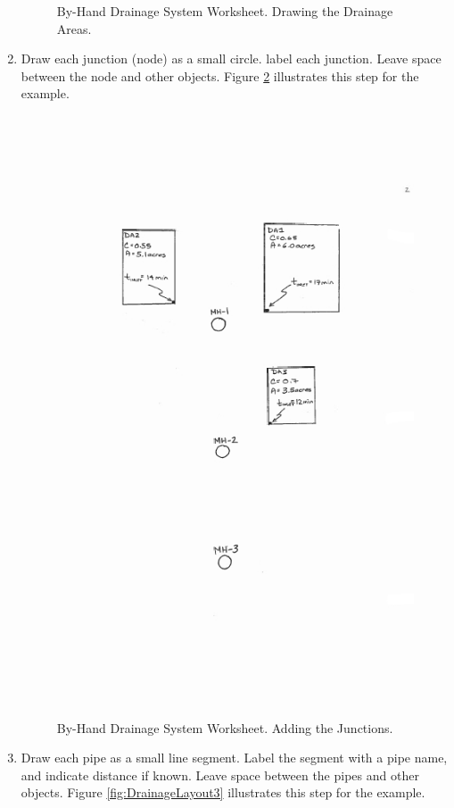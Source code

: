 \documentclass[12pt]{article}
\begin{document}
\begin{enumerate}
\begin{figure}[ht!]
   \caption{By-Hand Drainage System Worksheet.  Drawing the Drainage Areas.}
   \label{fig:DrainageLayout1} 
\end{figure}
\clearpage
\item Draw each junction (node) as a small circle.
label each junction.
Leave space between the node and other objects.
Figure \ref{fig:DrainageLayout2} illustrates this step for the example.
\begin{figure}[ht!] %
\centering
   \includegraphics[height=7in]{DrainageLayout2.jpg}
   \caption{By-Hand Drainage System Worksheet. Adding the Junctions.}
   \label{fig:DrainageLayout2} 
\end{figure}
\clearpage
\item Draw each pipe as a small line segment.
Label the segment with a pipe name, and indicate distance if known.
Leave space between the pipes and other objects.
Figure \ref{fig:DrainageLayout3} illustrates this step for the example.

\end{enumerate}
\end{document}
